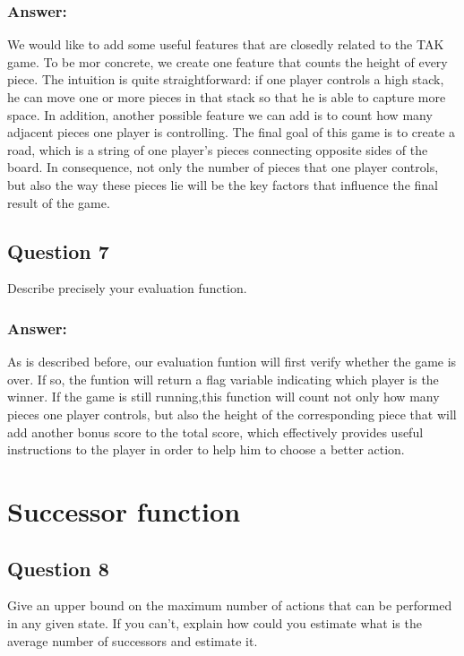 \documentclass[12pt, a4paper]{report}
\begin{document}
\subsubsection{Answer:}
We would like to add some useful features that are closedly related to the TAK game. To be mor concrete, we create one feature that counts the height of every piece. The intuition is quite straightforward: if one player controls a high stack, he can move one or more pieces in that stack so that he is able to capture more space. In addition, another possible feature we can add is to count how many adjacent pieces one player is controlling. The final goal of this game is to create a road, which is a string of one player's pieces connecting opposite sides of the board. In consequence, not only the number of pieces that one player controls, but also the way these pieces lie will be the key factors that influence the final result of the game.
\subsection{Question 7}
Describe precisely your evaluation function.
\subsubsection{Answer:}
As is described before, our evaluation funtion will first verify whether the game is over. If so, the funtion will return a flag variable indicating which player is the winner. If the game is still running,this function will count not only how many pieces one player controls, but also the height of the corresponding piece that will add another bonus score to the total score, which effectively provides useful instructions to the player in order to help him to choose a better action.

\section{Successor function}
\subsection{Question 8}
Give an upper bound on the maximum number of actions that can be performed in any given state. If you can’t, explain how could you estimate what is the average number of successors and estimate it.
\end{document}
